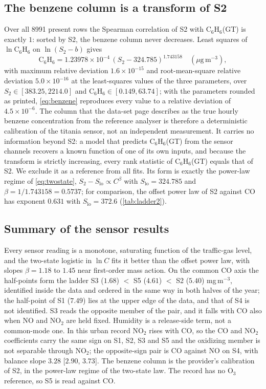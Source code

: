 \documentclass[11pt]{article}
\theoremstyle{definition}\newtheorem{definition}[theorem]{Definition}
\theoremstyle{remark}\newtheorem{remark}[theorem]{Remark}
\begin{document}
\subsection{The benzene column is a transform of S2}\label{sec:benzene}
Over all 8991 present rows the Spearman correlation of S2 with C$_6$H$_6$(GT) is exactly $1$: sorted by S2, the benzene column never decreases. Least squares of $\ln\mathrm{C_6H_6}$ on $\ln(S_2-b)$ gives
\begin{equation}\label{eq:benzene}
\mathrm{C_6H_6}=1.23978\times10^{-4}\,(S_2-324.785)^{1.743158}\quad(\mu\mathrm g\,\mathrm m^{-3}),
\end{equation}
with maximum relative deviation $1.6\times10^{-15}$ and root-mean-square relative deviation $5.0\times10^{-16}$ at the least-squares values of the three parameters, over $S_2\in[383.25,2214.0]$ and $\mathrm{C_6H_6}\in[0.149,63.74]$; with the parameters rounded as printed, \eqref{eq:benzene} reproduces every value to a relative deviation of $4.5\times10^{-6}$. The column that the data-set page describes as the true hourly benzene concentration from the reference analyser is therefore a deterministic calibration of the titania sensor, not an independent measurement. It carries no information beyond S2: a model that predicts C$_6$H$_6$(GT) from the sensor channels recovers a known function of one of its own inputs, and because the transform is strictly increasing, every rank statistic of C$_6$H$_6$(GT) equals that of S2. We exclude it as a reference from all fits. Its form is exactly the power-law regime of \eqref{eq:twostate}, $S_2-S_\mathrm{lo}\propto C^{\beta}$ with $S_\mathrm{lo}=324.785$ and $\beta=1/1.743158=0.5737$; for comparison, the offset power law of S2 against CO has exponent $0.631$ with $S_\mathrm{lo}=372.6$ (\cref{tab:ladder2}).

\subsection{Summary of the sensor results}\label{sec:sensorsum}
Every sensor reading is a monotone, saturating function of the traffic-gas level, and the two-state logistic in $\ln C$ fits it better than the offset power law, with slopes $\beta=1.18$ to $1.45$ near first-order mass action. On the common CO axis the half-points form the ladder S3 ($1.68$) $<$ S5 ($4.61$) $<$ S2 ($5.40$) mg\,m$^{-3}$, identified inside the data and ordered in the same way in both halves of the year; the half-point of S1 ($7.49$) lies at the upper edge of the data, and that of S4 is not identified. S3 reads the opposite member of the pair, and it falls with CO also when NO and NO$_2$ are held fixed. Humidity is a release-side term, not a common-mode one. In this urban record NO$_2$ rises with CO, so the CO and NO$_2$ coefficients carry the same sign on S1, S2, S3 and S5 and the oxidizing member is not separable through NO$_2$; the opposite-sign pair is CO against NO on S4, with balance slope $3.28$ [$2.90$, $3.73$]. The benzene column is the provider's calibration of S2, in the power-law regime of the two-state law. The record has no O$_3$ reference, so S5 is read against CO.
\end{document}
